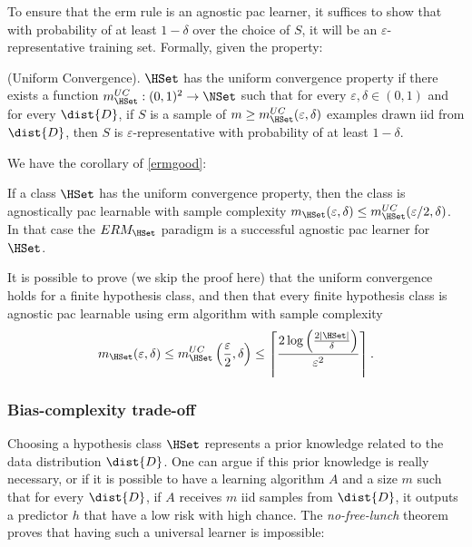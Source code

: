 To ensure that the \ac{erm} rule is an agnostic \ac{pac} learner, it
suffices to show that with probability of at least $1-\delta$ over the
choice of $S$, it will be an $\varepsilon$-representative training
set. Formally, given the property:
\begin{definition}
  (Uniform Convergence). $\HSet$ has the uniform convergence property
  if there exists a function $m_\HSet^{UC}:(0,1)^2\rightarrow\NSet$
  such that for every $\varepsilon,\delta\in(0,1)$ and for every
  $\dist{D}$, if $S$ is a sample of $m\geq
  m_\HSet^{UC}(\varepsilon,\delta)$ examples drawn \ac{iid} from
  $\dist{D}$, then $S$ is $\varepsilon$-representative with
  probability of at least $1-\delta$.
\end{definition}
We have the corollary of \cref{ermgood}:
\begin{corollary}
  If a class $\HSet$ has the uniform convergence property, then the
  class is agnostically \ac{pac} learnable with sample complexity
  $m_\HSet(\varepsilon,\delta)\leq
  m_\HSet^{UC}(\varepsilon/2,\delta)$. In that case the $ERM_\HSet$
  paradigm is a successful agnostic \ac{pac} learner for $\HSet$.
\end{corollary}

It is possible to prove (we skip the proof here) that the uniform convergence
holds for a finite
hypothesis class, and then that every finite hypothesis class is
agnostic \ac{pac} learnable using \ac{erm} algorithm with sample
complexity
\begin{equation*}
  m_\HSet(\varepsilon, \delta)\leq
  m_\HSet^{UC}\left(\frac{\varepsilon}{2},\delta\right)\leq\left\lceil\frac{2\log\left(\frac{2|\HSet|}{\delta}\right)}{\varepsilon^2}\right\rceil.
\end{equation*}

\subsubsection{Bias-complexity trade-off}
Choosing a hypothesis class $\HSet$ represents a prior
knowledge related to the data distribution $\dist{D}$. One can argue
if this prior knowledge is really necessary, or 
if it is possible to have a learning algorithm $A$ and a size $m$ such
that for every $\dist{D}$, if $A$ receives $m$ \ac{iid} samples from
$\dist{D}$, it outputs a predictor $h$ that have a low risk with high
chance. The \emph{no-free-lunch} theorem proves that having such a
universal learner is impossible:

